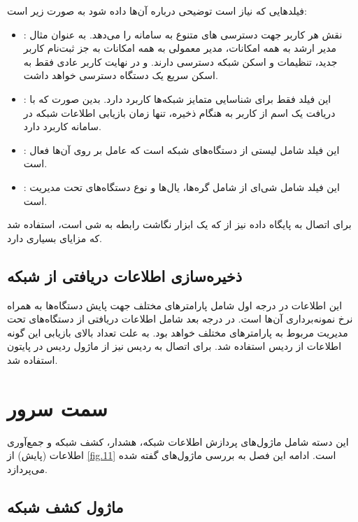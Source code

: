 فیلدهایی که نیاز است توضیحی درباره آن‌ها داده شود به صورت زیر است:

\begin{itemize}
    \item {}: نقش هر کاربر جهت دسترسی ‌های متنوع به سامانه را می‌دهد. به عنوان مثال مدیر ارشد به همه امکانات، مدیر معمولی به همه امکانات به جز ثبت‌نام کاربر جدید، تنظیمات و اسکن شبکه دسترسی دارند. و در نهایت کاربر عادی فقط به اسکن سریع یک دستگاه دسترسی خواهد داشت.
    \item {}: این فیلد فقط برای شناسایی متمایز شبکه‌ها کاربرد دارد. بدین صورت که با دریافت یک اسم از کاربر به هنگام ذخیره، تنها زمان بازیابی اطلاعات شبکه در سامانه کاربرد دارد.
    \item {}: این فیلد شامل لیستی از دستگاه‌های شبکه است که عامل  بر روی آن‌ها فعال است.
    \item {}: این فیلد شامل شی‌ای از  شامل گره‌ها، یال‌ها و نوع دستگاه‌های تحت مدیریت است.

\end{itemize}


برای اتصال به پایگاه داده  نیز از  که یک ابزار نگاشت رابطه به شی است، استفاده شد که مزایای بسیاری دارد.



\subsection{ذخیره‌سازی اطلاعات دریافتی از شبکه}

این اطلاعات در درجه اول شامل پارامتر‌های مختلف جهت پایش دستگاه‌ها به همراه نرخ نمونه‌برداری آن‌ها است. در درجه بعد شامل اطلاعات دریافتی از دستگاه‌های تحت مدیریت مربوط به پارامترهای مختلف خواهد بود. به علت تعداد بالای بازیابی این گونه اطلاعات از ردیس استفاده شد. برای اتصال به ردیس نیز از ماژول ردیس در پایتون استفاده شد.

\newpage

\section{سمت سرور}

این دسته شامل ماژول‌های پردازش اطلاعات شبکه، هشدار، کشف شبکه و جمع‌آوری اطلاعات (پایش) از \cref{fig.11} است. ادامه این فصل به بررسی ماژول‌های گفته شده می‌پردازد.


\subsection{ماژول کشف شبکه}

